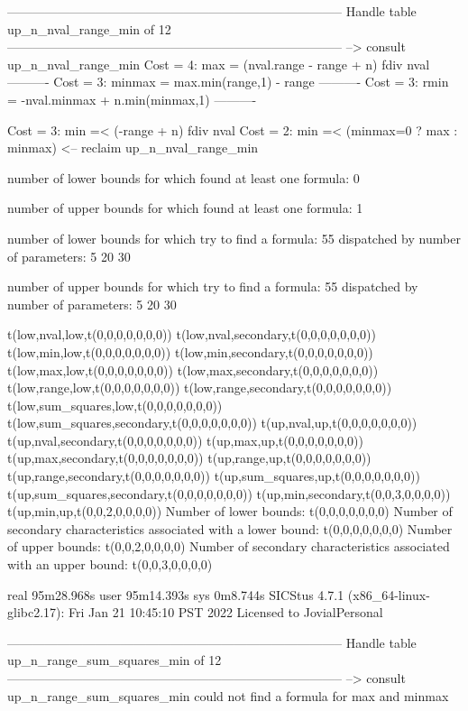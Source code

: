 --------------------------------------------------------------------------------
Handle table up_n_nval_range_min of 12
--------------------------------------------------------------------------------
--> consult up_n_nval_range_min
Cost =  4:  max    = (nval.range - range + n) fdiv nval
----------
Cost =  3:  minmax = max.min(range,1) - range
----------
Cost =  3:  rmin   = -nval.minmax + n.min(minmax,1)
----------

Cost =  3:  min =< (-range + n) fdiv nval
Cost =  2:  min =< (minmax=0 ? max : minmax)
<-- reclaim up_n_nval_range_min

number of lower bounds for which found at least one formula: 0

number of upper bounds for which found at least one formula: 1

number of lower bounds for which try to find a formula: 55
dispatched by number of parameters: 5  20  30

number of upper bounds for which try to find a formula: 55
dispatched by number of parameters: 5  20  30

t(low,nval,low,t(0,0,0,0,0,0,0))
t(low,nval,secondary,t(0,0,0,0,0,0,0))
t(low,min,low,t(0,0,0,0,0,0,0))
t(low,min,secondary,t(0,0,0,0,0,0,0))
t(low,max,low,t(0,0,0,0,0,0,0))
t(low,max,secondary,t(0,0,0,0,0,0,0))
t(low,range,low,t(0,0,0,0,0,0,0))
t(low,range,secondary,t(0,0,0,0,0,0,0))
t(low,sum_squares,low,t(0,0,0,0,0,0,0))
t(low,sum_squares,secondary,t(0,0,0,0,0,0,0))
t(up,nval,up,t(0,0,0,0,0,0,0))
t(up,nval,secondary,t(0,0,0,0,0,0,0))
t(up,max,up,t(0,0,0,0,0,0,0))
t(up,max,secondary,t(0,0,0,0,0,0,0))
t(up,range,up,t(0,0,0,0,0,0,0))
t(up,range,secondary,t(0,0,0,0,0,0,0))
t(up,sum_squares,up,t(0,0,0,0,0,0,0))
t(up,sum_squares,secondary,t(0,0,0,0,0,0,0))
t(up,min,secondary,t(0,0,3,0,0,0,0))
t(up,min,up,t(0,0,2,0,0,0,0))
Number of lower bounds:                                             t(0,0,0,0,0,0,0)
Number of secondary characteristics associated with a lower bound:  t(0,0,0,0,0,0,0)
Number of upper bounds:                                             t(0,0,2,0,0,0,0)
Number of secondary characteristics associated with an upper bound: t(0,0,3,0,0,0,0)

real	95m28.968s
user	95m14.393s
sys	0m8.744s
SICStus 4.7.1 (x86_64-linux-glibc2.17): Fri Jan 21 10:45:10 PST 2022
Licensed to JovialPersonal


--------------------------------------------------------------------------------
Handle table up_n_range_sum_squares_min of 12
--------------------------------------------------------------------------------
--> consult up_n_range_sum_squares_min
could not find a formula for max and minmax

